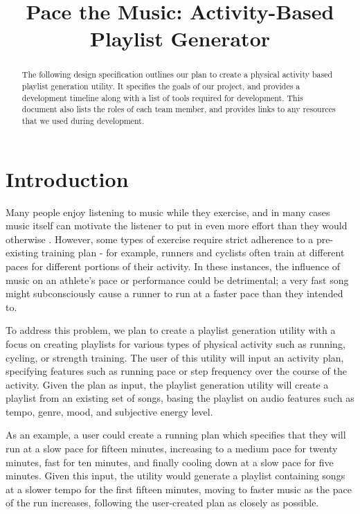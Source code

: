 \documentclass{article}
\title{Pace the Music: Activity-Based Playlist Generator}
\begin{document}
%
\maketitle
%
\begin{abstract}
The following design specification outlines our plan to create a physical activity based playlist generation utility. It specifies the goals of our project, and provides a development timeline along with a list of tools required for development. This document also lists the roles of each team member, and provides links to any resources that we used during development.
\end{abstract}

\section{Introduction}
Many people enjoy listening to music while they exercise, and in many cases music itself can motivate the listener to put in even more effort than they would otherwise \cite{Shivar}. However, some types of exercise require strict adherence to a pre-existing training plan - for example, runners and cyclists often train at different paces for different portions of their activity. In these instances, the influence of music on an athlete's pace or performance could be detrimental; a very fast song might subconsciously cause a runner to run at a faster pace than they intended to.

To address this problem, we plan to create a playlist generation utility with a focus on creating playlists for various types of physical activity such as running, cycling, or strength training. The user of this utility will input an activity plan, specifying features such as running pace or step frequency over the course of the activity. Given the plan as input, the playlist generation utility will create a playlist from an existing set of songs, basing the playlist on audio features such as tempo, genre, mood, and subjective energy level.

As an example, a user could create a running plan which specifies that they will run at a slow pace for fifteen minutes, increasing to a medium pace for twenty minutes, fast for ten minutes, and finally cooling down at a slow pace for five minutes. Given this input, the utility would generate a playlist containing songs at a slower tempo for the first fifteen minutes, moving to faster music as the pace of the run increases, following the user-created plan as closely as possible.
\end{document}

